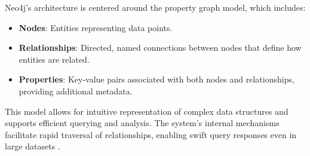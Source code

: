 Neo4j's architecture is centered around the property graph model, which includes\cite{huang2013research}:

\begin{itemize}
    \item \textbf{Nodes}: Entities representing data points.
    \item \textbf{Relationships}: Directed, named connections between nodes that define how entities are related.
    \item \textbf{Properties}: Key-value pairs associated with both nodes and relationships, providing additional metadata.
\end{itemize}

This model allows for intuitive representation of complex data structures and supports efficient querying and analysis. The system's internal mechanisms facilitate rapid traversal of relationships, enabling swift query responses even in large datasets \cite{huang2013research}.

